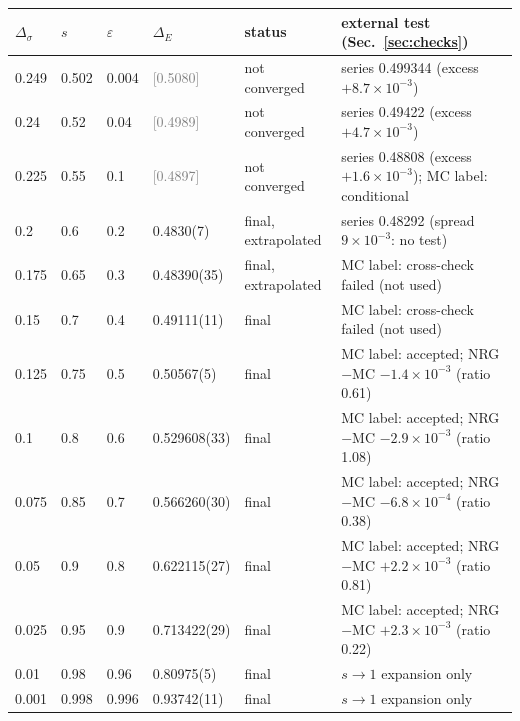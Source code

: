 \begin{tabular}{@{}lllll>{\raggedright\arraybackslash}p{6.4cm}@{}}
\toprule
$\Delta_\sigma$ & $s$ & $\varepsilon$ & $\Delta_E$ & status & external test (Sec.~\ref{sec:checks})\\
\midrule
0.249 & 0.502 & 0.004 & \textcolor{gray}{[0.5080]} & not converged & series 0.499344 (excess $+8.7\times10^{-3}$)\\
0.24 & 0.52 & 0.04 & \textcolor{gray}{[0.4989]} & not converged & series 0.49422 (excess $+4.7\times10^{-3}$)\\
0.225 & 0.55 & 0.1 & \textcolor{gray}{[0.4897]} & not converged & series 0.48808 (excess $+1.6\times10^{-3}$); MC label: conditional\\
0.2 & 0.6 & 0.2 & 0.4830(7) & final, extrapolated & series 0.48292 (spread $9\times10^{-3}$: no test)\\
0.175 & 0.65 & 0.3 & 0.48390(35) & final, extrapolated & MC label: cross-check failed (not used)\\
0.15 & 0.7 & 0.4 & 0.49111(11) & final & MC label: cross-check failed (not used)\\
0.125 & 0.75 & 0.5 & 0.50567(5) & final & MC label: accepted; NRG$-$MC $-1.4\times10^{-3}$ (ratio 0.61)\\
0.1 & 0.8 & 0.6 & 0.529608(33) & final & MC label: accepted; NRG$-$MC $-2.9\times10^{-3}$ (ratio 1.08)\\
0.075 & 0.85 & 0.7 & 0.566260(30) & final & MC label: accepted; NRG$-$MC $-6.8\times10^{-4}$ (ratio 0.38)\\
0.05 & 0.9 & 0.8 & 0.622115(27) & final & MC label: accepted; NRG$-$MC $+2.2\times10^{-3}$ (ratio 0.81)\\
0.025 & 0.95 & 0.9 & 0.713422(29) & final & MC label: accepted; NRG$-$MC $+2.3\times10^{-3}$ (ratio 0.22)\\
0.01 & 0.98 & 0.96 & 0.80975(5) & final & $s\to1$ expansion only\\
0.001 & 0.998 & 0.996 & 0.93742(11) & final & $s\to1$ expansion only\\
\bottomrule
\end{tabular}
